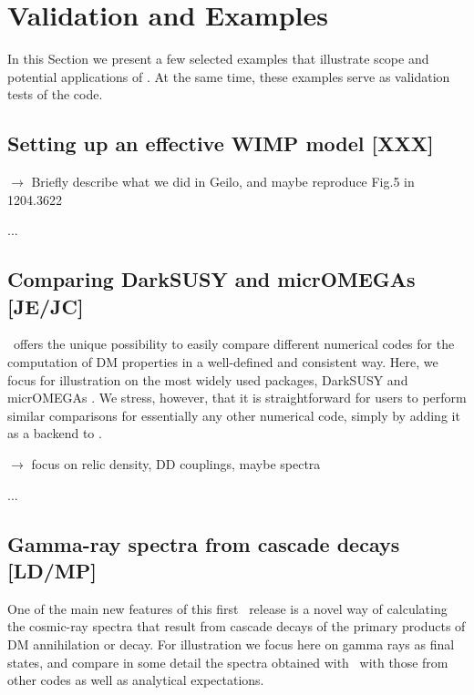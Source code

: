 \section{Validation and  Examples}
\label{examples}

In this Section we present a few selected  examples that illustrate scope and
potential applications of \DB. At the same time, these examples serve as validation
tests of the code.

\subsection{Setting up an effective WIMP model {\bf [XXX]}}

$\to$ Briefly describe what we did in Geilo, and maybe reproduce Fig.5 in 1204.3622

\medskip
...

\subsection{Comparing {\sf DarkSUSY} and {\sf micrOMEGAs} {\bf [JE/JC]}}

\DB\ offers the unique possibility to easily compare different numerical codes for the computation of DM properties
in a well-defined and consistent way. Here, we focus for illustration on the most widely used packages, {\sf DarkSUSY} 
\cite{xxx} and {\sf micrOMEGAs} \cite{xxx}. We stress, however, that it is straightforward for users to 
perform similar comparisons for essentially any other numerical code, simply by adding it as a backend to \DB.

\medskip
$\to$ focus on relic density, DD couplings, maybe spectra

\medskip
...


\subsection{Gamma-ray spectra from cascade decays {\bf [LD/MP]}}

One of the main new features of this first \DB\ release is a novel way of calculating the cosmic-ray spectra that result from 
cascade decays of the primary products of DM annihilation or decay. For illustration we focus here on gamma
rays as final states, and compare in some detail the spectra obtained with \DB\ with those from other codes
as well as analytical expectations.

